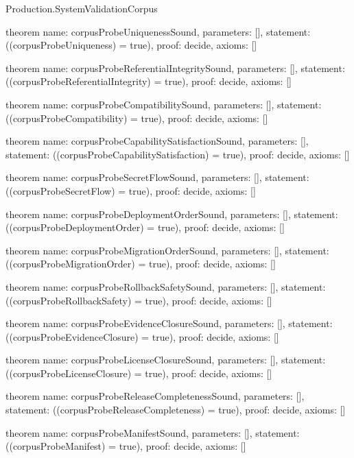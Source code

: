 \begin{lexlean}{Production.SystemValidationCorpus}
\begin{semanticmodule}
theorem{
  name: corpusProbeUniquenessSound,
  parameters: [],
  statement: ((corpusProbeUniqueness) = true),
  proof: decide{},
  axioms: []
}

theorem{
  name: corpusProbeReferentialIntegritySound,
  parameters: [],
  statement: ((corpusProbeReferentialIntegrity) = true),
  proof: decide{},
  axioms: []
}

theorem{
  name: corpusProbeCompatibilitySound,
  parameters: [],
  statement: ((corpusProbeCompatibility) = true),
  proof: decide{},
  axioms: []
}

theorem{
  name: corpusProbeCapabilitySatisfactionSound,
  parameters: [],
  statement: ((corpusProbeCapabilitySatisfaction) = true),
  proof: decide{},
  axioms: []
}

theorem{
  name: corpusProbeSecretFlowSound,
  parameters: [],
  statement: ((corpusProbeSecretFlow) = true),
  proof: decide{},
  axioms: []
}

theorem{
  name: corpusProbeDeploymentOrderSound,
  parameters: [],
  statement: ((corpusProbeDeploymentOrder) = true),
  proof: decide{},
  axioms: []
}

theorem{
  name: corpusProbeMigrationOrderSound,
  parameters: [],
  statement: ((corpusProbeMigrationOrder) = true),
  proof: decide{},
  axioms: []
}

theorem{
  name: corpusProbeRollbackSafetySound,
  parameters: [],
  statement: ((corpusProbeRollbackSafety) = true),
  proof: decide{},
  axioms: []
}

theorem{
  name: corpusProbeEvidenceClosureSound,
  parameters: [],
  statement: ((corpusProbeEvidenceClosure) = true),
  proof: decide{},
  axioms: []
}

theorem{
  name: corpusProbeLicenseClosureSound,
  parameters: [],
  statement: ((corpusProbeLicenseClosure) = true),
  proof: decide{},
  axioms: []
}

theorem{
  name: corpusProbeReleaseCompletenessSound,
  parameters: [],
  statement: ((corpusProbeReleaseCompleteness) = true),
  proof: decide{},
  axioms: []
}

theorem{
  name: corpusProbeManifestSound,
  parameters: [],
  statement: ((corpusProbeManifest) = true),
  proof: decide{},
  axioms: []
}
\end{semanticmodule}
\end{lexlean}
